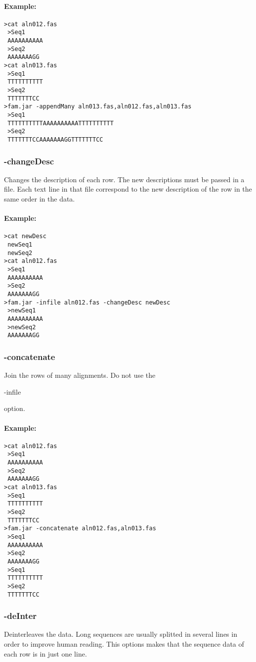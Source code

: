 \documentclass[a4paper, twoside,10pt]{article}
\begin{document}
\paragraph{Example:}
\begin{verbatim}
>cat aln012.fas
 >Seq1
 AAAAAAAAAA
 >Seq2
 AAAAAAAGG
>cat aln013.fas
 >Seq1
 TTTTTTTTTT
 >Seq2
 TTTTTTTCC
>fam.jar -appendMany aln013.fas,aln012.fas,aln013.fas
 >Seq1
 TTTTTTTTTTAAAAAAAAAATTTTTTTTTT
 >Seq2
 TTTTTTTCCAAAAAAAGGTTTTTTTCC
\end{verbatim}

\subsubsection{-changeDesc}
Changes the description of each row. The new descriptions must be passed in a 
file. Each text line in that file correspond to the new description of the row
in the same order in the data.

\paragraph{Example:}
\begin{verbatim}
>cat newDesc
 newSeq1
 newSeq2
>cat aln012.fas
 >Seq1
 AAAAAAAAAA
 >Seq2
 AAAAAAAGG
>fam.jar -infile aln012.fas -changeDesc newDesc
 >newSeq1
 AAAAAAAAAA
 >newSeq2
 AAAAAAAGG
\end{verbatim}

\subsubsection{-concatenate}
Join the rows of many alignments. Do not use the \begin{tt}-infile\end{tt} 
option. 
\paragraph{Example:}
\begin{verbatim}
>cat aln012.fas
 >Seq1
 AAAAAAAAAA
 >Seq2
 AAAAAAAGG
>cat aln013.fas
 >Seq1
 TTTTTTTTTT
 >Seq2
 TTTTTTTCC
>fam.jar -concatenate aln012.fas,aln013.fas
 >Seq1
 AAAAAAAAAA
 >Seq2
 AAAAAAAGG
 >Seq1
 TTTTTTTTTT
 >Seq2
 TTTTTTTCC
\end{verbatim}

\subsubsection{-deInter}
Deinterleaves the data. Long sequences are usually splitted in several lines in
order to improve human reading. This options makes that the sequence data of 
each row is in just one line.   
\end{document}
